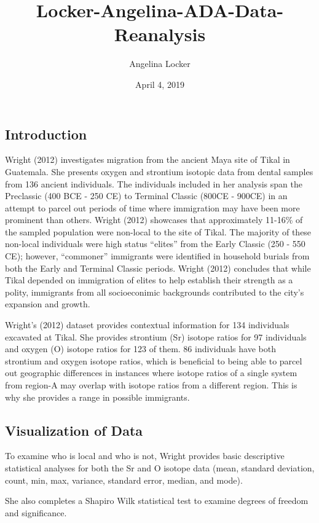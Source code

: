 \documentclass[]{article}
\title{Locker-Angelina-ADA-Data-Reanalysis}
\author{Angelina Locker}
\date{April 4, 2019}
\begin{document}
\maketitle

\subsection{Introduction}\label{introduction}

Wright (2012) investigates migration from the ancient Maya site of Tikal
in Guatemala. She presents oxygen and strontium isotopic data from
dental samples from 136 ancient individuals. The individuals included in
her analysis span the Preclassic (400 BCE - 250 CE) to Terminal Classic
(800CE - 900CE) in an attempt to parcel out periods of time where
immigration may have been more prominent than others. Wright (2012)
showcases that approximately 11-16\% of the sampled population were
non-local to the site of Tikal. The majority of these non-local
individuals were high status ``elites'' from the Early Classic (250 -
550 CE); however, ``commoner'' immigrants were identified in household
burials from both the Early and Terminal Classic periods. Wright (2012)
concludes that while Tikal depended on immigration of elites to help
establish their strength as a polity, immigrants from all socioeconimic
backgrounds contributed to the city's expansion and growth.

Wright's (2012) dataset provides contextual information for 134
individuals excavated at Tikal. She provides strontium (Sr) isotope
ratios for 97 individuals and oxygen (O) isotope ratios for 123 of them.
86 individuals have both strontium and oxygen isotope ratios, which is
beneficial to being able to parcel out geographic differences in
instances where isotope ratios of a single system from region-A may
overlap with isotope ratios from a different region. This is why she
provides a range in possible immigrants.

\subsection{Visualization of Data}\label{visualization-of-data}

To examine who is local and who is not, Wright provides basic
descriptive statistical analyses for both the Sr and O isotope data
(mean, standard deviation, count, min, max, variance, standard error,
median, and mode).

She also completes a Shapiro Wilk statistical test to examine degrees of
freedom and significance.
\end{document}
